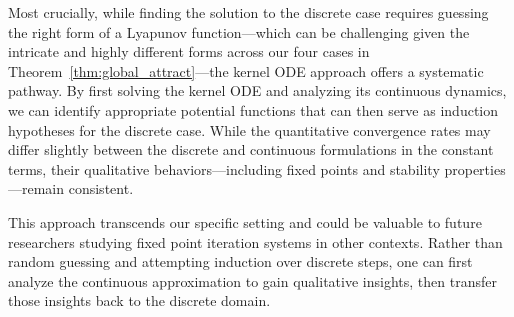 \documentclass[twoside]{article}
\theoremstyle{definition}
\begin{document}
Most crucially, while finding the solution to the discrete case requires guessing the right form of a Lyapunov function—which can be challenging given the intricate and highly different forms across our four cases in Theorem~\ref{thm:global_attract}—the kernel ODE approach offers a systematic pathway. By first solving the kernel ODE and analyzing its continuous dynamics, we can identify appropriate potential functions that can then serve as induction hypotheses for the discrete case. While the quantitative convergence rates may differ slightly between the discrete and continuous formulations in the constant terms, their qualitative behaviors—including fixed points and stability properties—remain consistent.

This approach transcends our specific setting and could be valuable to future researchers studying fixed point iteration systems in other contexts. Rather than random guessing and attempting induction over discrete steps, one can first analyze the continuous approximation to gain qualitative insights, then transfer those insights back to the discrete domain.


\end{document}
